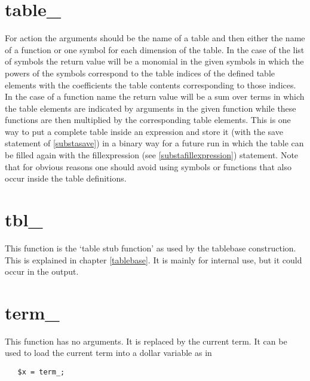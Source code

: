 
\section{table\_}
\label{funtable}
\noindent For action the arguments should be the name of a table and then 
either the name of a function or one symbol for each dimension of the 
table. In the case of the list of symbols the return value will be a 
monomial in the given symbols in which the powers of the symbols correspond 
to the table indices of the defined table elements with the coefficients 
the table contents corresponding to those indices. In the case of a 
function name the return value will be a sum over terms in which the table 
elements are indicated by arguments in the given function while these 
functions are then multiplied by the corresponding table elements. This is 
one way to put a complete table inside an expression and store it (with the 
save statement of \ref{substasave}) in a binary way for a future run in 
which the table can be filled again with the 
fillexpression (see \ref{substafillexpression}) 
statement. Note that for obvious reasons one should avoid using symbols or 
functions that also occur inside the table definitions.


\section{tbl\_}
\label{funtbl}
\noindent This function is the `table stub function' as used by the 
tablebase construction. This is explained in chapter 
\ref{tablebase}. It is mainly for internal use, but it could occur in the 
output.


\section{term\_}
\label{funterm}
\noindent This function has no arguments. It is replaced by the current 
term. It can be used to load the current term into a dollar variable as in
\begin{verbatim}
   $x = term_;
\end{verbatim}


